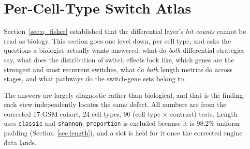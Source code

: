 \documentclass[11pt,a4paper]{article}
\begin{document}
\section{Per-Cell-Type Switch Atlas}
\label{sec:switch_atlas}

Section~\ref{sec:q_fisher} established that the differential layer's \emph{hit
counts} cannot be read as biology. This section goes one level down, per cell
type, and asks the questions a biologist actually wants answered: what do
\emph{both} differential strategies say, what does the distribution of switch
effects look like, which genes are the strongest and most recurrent switches,
what do \emph{both} length metrics do across stages, and what pathways do the
switch-gene sets belong to.

The answers are largely diagnostic rather than biological, and that is the
finding: each view independently locates the same defect. All numbers are from
the corrected 17-GSM cohort, 24 cell types, 90 (cell type $\times$ contrast)
tests. Length uses \texttt{classic} and \texttt{shannon}; \texttt{proportion} is
excluded because it is 98.2\% uniform padding (Section~\ref{sec:length}), and a
slot is held for it once the corrected engine data lands.
\end{document}
